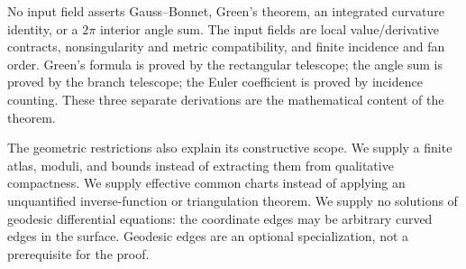 No input field asserts Gauss--Bonnet, Green's theorem, an integrated curvature identity, or a $2\pi$ interior angle sum. The input fields are local value/derivative contracts, nonsingularity and metric compatibility, and finite incidence and fan order. Green's formula is proved by the rectangular telescope; the angle sum is proved by the branch telescope; the Euler coefficient is proved by incidence counting. These three separate derivations are the mathematical content of the theorem.

The geometric restrictions also explain its constructive scope. We supply a finite atlas, moduli, and bounds instead of extracting them from qualitative compactness. We supply effective common charts instead of applying an unquantified inverse-function or triangulation theorem. We supply no solutions of geodesic differential equations: the coordinate edges may be arbitrary curved edges in the surface. Geodesic edges are an optional specialization, not a prerequisite for the proof.
